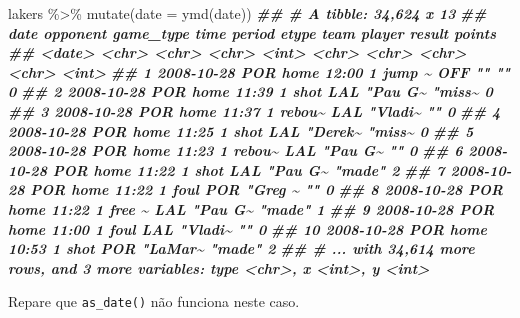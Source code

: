 \documentclass[
]{book}
\newenvironment{Shaded}{\begin{snugshade}}{\end{snugshade}}
\newcommand{\AttributeTok}[1]{\textcolor[rgb]{0.77,0.63,0.00}{#1}}
\newcommand{\DocumentationTok}[1]{\textcolor[rgb]{0.56,0.35,0.01}{\textbf{\textit{#1}}}}
\newcommand{\FunctionTok}[1]{\textcolor[rgb]{0.00,0.00,0.00}{#1}}
\newcommand{\NormalTok}[1]{#1}
\newcommand{\SpecialCharTok}[1]{\textcolor[rgb]{0.00,0.00,0.00}{#1}}
\begin{document}
\begin{Shaded}
\begin{Highlighting}[]
\NormalTok{lakers }\SpecialCharTok{\%\textgreater{}\%} 
  \FunctionTok{mutate}\NormalTok{(}\AttributeTok{date =} \FunctionTok{ymd}\NormalTok{(date))}
\DocumentationTok{\#\# \# A tibble: 34,624 x 13}
\DocumentationTok{\#\#    date       opponent game\_type time  period etype  team  player  result points}
\DocumentationTok{\#\#    \textless{}date\textgreater{}     \textless{}chr\textgreater{}    \textless{}chr\textgreater{}     \textless{}chr\textgreater{}  \textless{}int\textgreater{} \textless{}chr\textgreater{}  \textless{}chr\textgreater{} \textless{}chr\textgreater{}   \textless{}chr\textgreater{}   \textless{}int\textgreater{}}
\DocumentationTok{\#\#  1 2008{-}10{-}28 POR      home      12:00      1 jump \textasciitilde{} OFF   ""      ""          0}
\DocumentationTok{\#\#  2 2008{-}10{-}28 POR      home      11:39      1 shot   LAL   "Pau G\textasciitilde{} "miss\textasciitilde{}      0}
\DocumentationTok{\#\#  3 2008{-}10{-}28 POR      home      11:37      1 rebou\textasciitilde{} LAL   "Vladi\textasciitilde{} ""          0}
\DocumentationTok{\#\#  4 2008{-}10{-}28 POR      home      11:25      1 shot   LAL   "Derek\textasciitilde{} "miss\textasciitilde{}      0}
\DocumentationTok{\#\#  5 2008{-}10{-}28 POR      home      11:23      1 rebou\textasciitilde{} LAL   "Pau G\textasciitilde{} ""          0}
\DocumentationTok{\#\#  6 2008{-}10{-}28 POR      home      11:22      1 shot   LAL   "Pau G\textasciitilde{} "made"      2}
\DocumentationTok{\#\#  7 2008{-}10{-}28 POR      home      11:22      1 foul   POR   "Greg \textasciitilde{} ""          0}
\DocumentationTok{\#\#  8 2008{-}10{-}28 POR      home      11:22      1 free \textasciitilde{} LAL   "Pau G\textasciitilde{} "made"      1}
\DocumentationTok{\#\#  9 2008{-}10{-}28 POR      home      11:00      1 foul   LAL   "Vladi\textasciitilde{} ""          0}
\DocumentationTok{\#\# 10 2008{-}10{-}28 POR      home      10:53      1 shot   POR   "LaMar\textasciitilde{} "made"      2}
\DocumentationTok{\#\# \# ... with 34,614 more rows, and 3 more variables: type \textless{}chr\textgreater{}, x \textless{}int\textgreater{}, y \textless{}int\textgreater{}}
\end{Highlighting}
\end{Shaded}

Repare que \texttt{as\_date()} não funciona neste caso.
\end{document}
